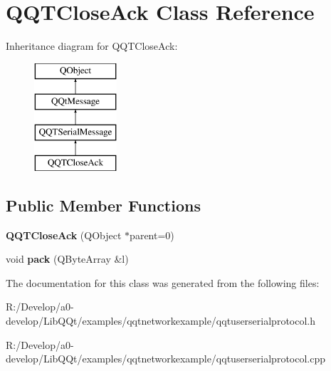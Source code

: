 \hypertarget{class_q_q_t_close_ack}{}\section{Q\+Q\+T\+Close\+Ack Class Reference}
\label{class_q_q_t_close_ack}
Inheritance diagram for Q\+Q\+T\+Close\+Ack\+:\begin{figure}[H]
\begin{center}
\leavevmode
\includegraphics[height=4.000000cm]{class_q_q_t_close_ack}
\end{center}
\end{figure}
\subsection*{Public Member Functions}
\begin{DoxyCompactItemize}
\item 
\mbox{\label{class_q_q_t_close_ack_adece5d7649412d9812a0d4babaaa7764}} 
{\bfseries Q\+Q\+T\+Close\+Ack} (Q\+Object $\ast$parent=0)
\item 
\mbox{\label{class_q_q_t_close_ack_abc70772638dc5fd00d7cf1914b7ab4f3}} 
void {\bfseries pack} (Q\+Byte\+Array \&l)
\end{DoxyCompactItemize}


The documentation for this class was generated from the following files\+:\begin{DoxyCompactItemize}
\item 
R\+:/\+Develop/a0-\/develop/\+Lib\+Q\+Qt/examples/qqtnetworkexample/qqtuserserialprotocol.\+h\item 
R\+:/\+Develop/a0-\/develop/\+Lib\+Q\+Qt/examples/qqtnetworkexample/qqtuserserialprotocol.\+cpp\end{DoxyCompactItemize}
